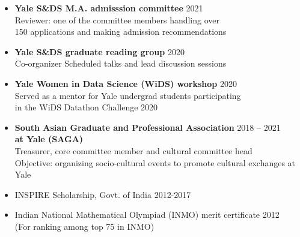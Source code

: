 \documentclass[letterpaper,12pt,oneside]{article}
\theoremstyle{definition}
\begin{document}
\begin{itemize}
				
				\item[] {\bf Yale S\&DS M.A. admisssion committee} \hfill 2021\\
				Reviewer: one of the committee members
				handling over\\ 150 applications
				and making admission recommendations
				
				\item[] {\bf Yale S\&DS graduate reading group} \hfill 2020\\
				Co-organizer
				Scheduled talks and lead discussion sessions
				
				\item[] {\bf Yale Women in Data Science (WiDS) workshop} \hfill 2020\\
				Served as a mentor for Yale undergrad students participating \\
				in the
				{WiDS Datathon Challenge 2020}
				
				\item[] {\bf South Asian Graduate and Professional Association} \hfill 2018 -- 2021\\
				{\bf at Yale (SAGA)}\\
				Treasurer, core committee member and cultural committee head\\
				Objective: organizing socio-cultural events to promote cultural exchanges at Yale
				
				
			\end{itemize}
			
			\begin{itemize}
				\item [] INSPIRE Scholarship, Govt. of India \hfill 2012-2017
				\item [] Indian National Mathematical Olympiad (INMO) merit certificate \hfill 2012\\
				(For ranking among top 75 in INMO)
			\end{itemize}
			
			\vfill
			
\end{document}
